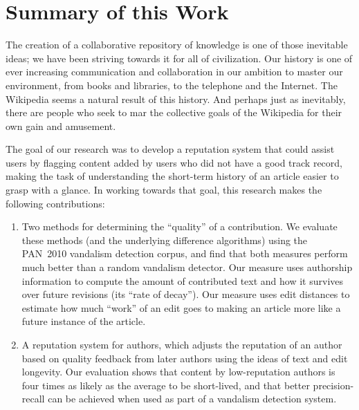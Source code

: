 \section{Summary of this Work}

The creation of a collaborative repository of knowledge is
one of those inevitable ideas; we have been striving towards it
for all of civilization.
Our history is one of ever increasing communication and collaboration
in our ambition to master our environment, from books and libraries,
to the telephone and the Internet.
The Wikipedia seems a natural result of this history.
And perhaps just as inevitably, there are people who seek to
mar the collective goals of the Wikipedia for their own gain and amusement.

The goal of our research was to develop a reputation system
that could assist users by flagging content added by users who
did not have a good track record, making the task of understanding
the short-term history of an article easier to grasp with a glance.
In working towards that goal, this research makes the following contributions:
\begin{enumerate}

\item Two methods for determining the ``quality'' of a contribution.
  We evaluate these methods (and the underlying difference algorithms)
  using the PAN~2010 vandalism detection corpus, and find that both
  measures perform much better than a random vandalism detector.
  Our  measure uses authorship information to
  compute the amount of contributed text and how it survives over
  future revisions (its ``rate of decay'').
  Our  measure uses edit distances to estimate
  how much ``work'' of an edit goes to making an article more like a
  future instance of the article.

\item A reputation system for authors,
  which adjusts the reputation of an author based on quality feedback
  from later authors using the ideas of text and edit longevity.
  Our evaluation shows that content by low-reputation authors is
  four times as likely as the average to be short-lived, and that better
  precision-recall can be achieved when used as part of a vandalism
  detection system.

\end{enumerate}

